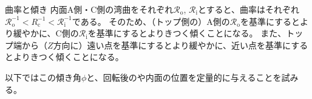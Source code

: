 \begin{\Columnname}{曲率と傾き}
内面A側・C側の湾曲をそれぞれ$\mathcal R_\mathrm o$, $\mathcal R_\mathrm i$とすると、曲率はそれぞれ$\mathcal R_\mathrm o^{-1} < R_\mathrm c^{-1} < \mathcal R_\mathrm i^{-1}$である。
そのため、（トップ側の）A側の$\mathcal R_\mathrm o$を基準にするとより緩やかに、C側の$\mathcal R_\mathrm i$を基準にするとよりきつく傾くことになる。
また、トップ端から（$Z$方向に）遠い点を基準にするとより緩やかに、近い点を基準にするとよりきつく傾くことになる。
\end{\Columnname}

以下ではこの傾き角$\phi$と、回転後の\Dimple や内面の位置を定量的に与えることを試みる。



